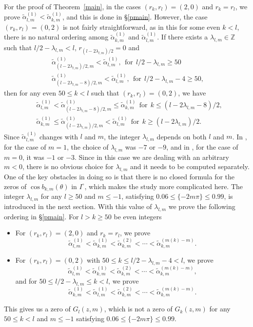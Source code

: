 \documentclass[12pt,reqno]{amsart}
\newcommand{\Z}{{\mathbb Z}}
\newcommand{\thmref}[1]{Theorem~\ref{#1}}
\begin{document}
For the proof of \thmref{main}, in the cases $(r_k,r_l)=(2,0)$ and $r_k=r_l$, we prove
$\tilde\alpha_{l,m}^{(1)}<\tilde\alpha_{k,m}^{(1)}$, and this is done in \S\ref{pmain}. However, the case $(r_k,r_l)=(0,2)$ is not fairly straightforward, as in this for some even $k<l$, there is no natural ordering among
$\tilde\alpha_{k,m}^{(1)}$ and $\tilde\alpha_{l,m}^{(1)}$. If there exists a $\lambda_{l,m}\in \Z$ such that $l/2-\lambda_{l,m}<l$, $r_{(l-2\lambda_{l,m})/2}=0$ and
\begin{align*}
    &\tilde \alpha_{(l-2\lambda_{l,m})/2,m}^{(1)}<\tilde\alpha_{l,m}^{(1)},\ \ \text{for} \ \ l/2-\lambda_{l,m}\ge 50  \ \ \\
&\tilde \alpha_{(l-2\lambda_{l,m}-8)/2,m}^{(1)}<\tilde\alpha_{l,m}^{(1)},\ \ \text{for} \ \  l/2-\lambda_{l,m}-4\ge 50,  \ \ 
\end{align*}
then for any even $50\le k<l$ such that $(r_k,r_l)=(0,2)$, we have
\begin{align*}
&\tilde\alpha_{l,m}^{(1)}<\tilde\alpha_{(l-2\lambda_{l,m}-8)/2,m}^{(1)}\le\tilde\alpha_{k,m}^{(1)} \ \ \text{for}\ \
k\le (l-2\lambda_{l,m}-8)/2, \\
&\tilde\alpha_{k,m}^{(1)}\le \tilde\alpha_{(l-2\lambda_{l,m})/2,m}^{(1)}<\tilde\alpha_{l,m}^{(1)}
\ \ \text{for}\ \ k\ge (l-2\lambda_{l,m})/2.
\end{align*}
Since $\tilde\alpha_{l,m}^{(1)}$
changes with $l$ and $m$, the integer $\lambda_{l,m}$ depends on both $l$ and $m$.
In \cite{KS2}, for the case of $m=1$, the choice of $\lambda_{l,m}$ was $-7$ or $-9$, and in \cite{GKP}, for the case of $m=0$, it was $-1$ or $-3$. Since in this case we are dealing with an arbitrary $m<0$, there is no obvious 
choice for $\lambda_{l,m}$ and it needs to be computed separately. One of the key 
obstacles in doing so is that there is no closed formula for the zeros of 
$\cos b_{k,m}(\theta)$ in $I^{\circ}$, which makes the study more complicated here.
 The integer $\lambda_{l,m}$ for any $l\ge 50$ and $m\le-1$, satisfying $0.06\le \{-2m\pi\}\le0.99$, is introduced in the next section. With this value of $\lambda_{l,m}$ we prove the 
following ordering in \S\ref{pmain}. For $l>k\ge50$ be even integers
\begin{itemize}
\item For $(r_k,r_l)=(2,0)$ and $r_k=r_l$, we prove
$$
\tilde\alpha_{l,m}^{(1)}<\tilde\alpha_{k,m}^{(1)}<\tilde\alpha_{k,m}^{(2)}<\cdots<\tilde\alpha_{k,m}^{(m(k)-m)}.
    $$
    \item  For $(r_k,r_l)=(0,2)$ with $50\le k\le l/2-\lambda_{l,m}-4<l$, we prove
    $$
\tilde\alpha_{l,m}^{(1)}<\tilde\alpha_{k,m}^{(1)}<\tilde\alpha_{k,m}^{(2)}<\cdots<\tilde\alpha_{k,m}^{(m(k)-m)},
    $$
and for $50\le l/2-\lambda_{l,m}\le k<l$, we prove
$$
\tilde\alpha_{k,m}^{(1)}<\tilde\alpha_{l,m}^{(1)}<\tilde\alpha_{k,m}^{(2)}<\cdots<\tilde\alpha_{k,m}^{(m(k)-m)}.
$$
\end{itemize}
This gives us a zero of $G_l(z,m)$, which is not a zero of $G_k(z,m)$ for any $50\le k<l$ and $m\le-1$ satisfying $0.06\le \{-2m\pi\}\le 0.99$.
\end{document}
